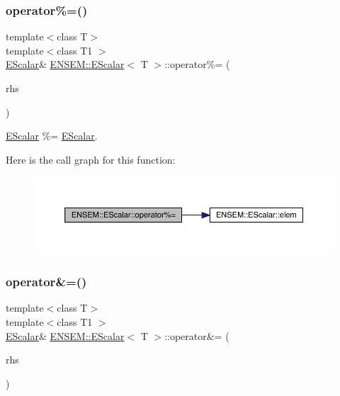 \subsubsection{\texorpdfstring{operator\%=()}{operator\%=()}\hspace{0.1cm}{\footnotesize\ttfamily [2/2]}}
{\footnotesize\ttfamily template$<$class T$>$ \\
template$<$class T1 $>$ \\
\mbox{\hyperlink{classENSEM_1_1EScalar}{E\+Scalar}}\& \mbox{\hyperlink{classENSEM_1_1EScalar}{E\+N\+S\+E\+M\+::\+E\+Scalar}}$<$ T $>$\+::operator\%= (\begin{DoxyParamCaption}\item[{const \mbox{\hyperlink{classENSEM_1_1EScalar}{E\+Scalar}}$<$ T1 $>$ \&}]{rhs }\end{DoxyParamCaption})\hspace{0.3cm}{\ttfamily [inline]}}



\mbox{\hyperlink{classENSEM_1_1EScalar}{E\+Scalar}} \%= \mbox{\hyperlink{classENSEM_1_1EScalar}{E\+Scalar}}. 

Here is the call graph for this function\+:
\nopagebreak
\begin{figure}[H]
\begin{center}
\leavevmode
\includegraphics[width=350pt]{d0/d82/classENSEM_1_1EScalar_ab4bd572c2f331fadf6914f406bce991f_cgraph}
\end{center}
\end{figure}
\mbox{\label{classENSEM_1_1EScalar_a4e16e2cecacdfefd6f01dcc360c6945b}} 
\subsubsection{\texorpdfstring{operator\&=()}{operator\&=()}\hspace{0.1cm}{\footnotesize\ttfamily [1/2]}}
{\footnotesize\ttfamily template$<$class T$>$ \\
template$<$class T1 $>$ \\
\mbox{\hyperlink{classENSEM_1_1EScalar}{E\+Scalar}}\& \mbox{\hyperlink{classENSEM_1_1EScalar}{E\+N\+S\+E\+M\+::\+E\+Scalar}}$<$ T $>$\+::operator\&= (\begin{DoxyParamCaption}\item[{const \mbox{\hyperlink{classENSEM_1_1EScalar}{E\+Scalar}}$<$ T1 $>$ \&}]{rhs }\end{DoxyParamCaption})\hspace{0.3cm}{\ttfamily [inline]}}



